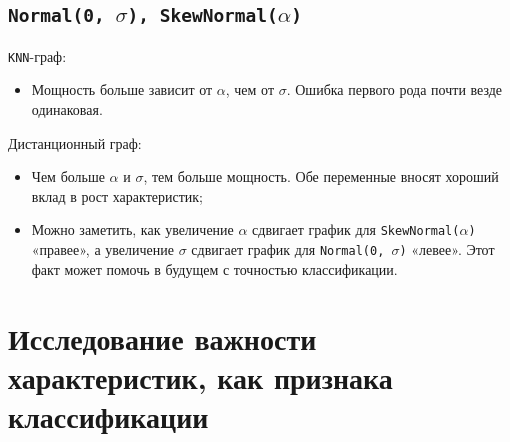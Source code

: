 \documentclass[12pt,a4paper]{report}
\begin{document}
\subsection{\texttt{Normal(0, $\sigma$), SkewNormal($\alpha$)}}
\texttt{KNN}-граф:
\begin{itemize}
    \item Мощность больше зависит от $\alpha$, чем от $\sigma$. Ошибка первого рода почти везде одинаковая.
\end{itemize}
Дистанционный граф:
\begin{itemize}
    \item Чем больше $\alpha$ и $\sigma$, тем больше мощность. Обе переменные вносят хороший вклад в рост характеристик;
    \item Можно заметить, как увеличение $\alpha$ сдвигает график для \texttt{SkewNormal($\alpha$)} «правее», а увеличение $\sigma$ сдвигает график для \texttt{Normal(0, $\sigma$)} «левее». Этот факт может помочь в будущем с точностью классификации.
\end{itemize}

\section{Исследование важности характеристик, как признака классификации}
\end{document}
